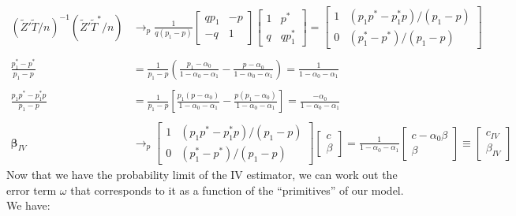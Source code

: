 \documentclass[12pt]{article}
\begin{document}
\begin{align*}
\left( \widetilde{Z}'\widetilde{T}/n \right)^{-1}\left( \widetilde{Z}'\widetilde{T}^*/n \right) &\rightarrow_p \frac{1}{q(p_1 -p)}\left[
\begin{array}{cc}
  qp_1 & - p\\
  -q & 1 
\end{array}
\right]
\left[
\begin{array}{cc}
  1 & p^*\\
  q & qp_1^*
\end{array}
\right]= 
\left[
\begin{array}{cc}
  1 & (p_1 p^* - p_1^* p)/(p_1 - p)\\
  0 & (p_1^* - p^*) / (p_1 - p)
\end{array}
\right] \\ \\ 
\frac{p_1^* - p^*}{p_1 - p} &= \frac{1}{p_1 - p}\left( \frac{p_1 - \alpha_0}{1 - \alpha_0 - \alpha_1} - \frac{p - \alpha_0}{1 - \alpha_0 - \alpha_1} \right) = \frac{1}{1 - \alpha_0 - \alpha_1}\\ \\
\frac{p_1 p^* - p_1^*p}{p_1 - p} &= \frac{1}{p_1 - p}\left[ \frac{p_1(p - \alpha_0)}{1 - \alpha_0 - \alpha_1} -  \frac{p(p_1 - \alpha_0)}{1 - \alpha_0 - \alpha_1} \right] = \frac{-\alpha_0}{1 - \alpha_0 - \alpha_1}\\ \\
\boldsymbol{\beta}_{IV} &\rightarrow_p 
\left[
\begin{array}{cc}
  1 & (p_1 p^* - p_1^* p)/(p_1 - p)\\
  0 & (p_1^* - p^*) / (p_1 - p)
\end{array}
\right]\left[
\begin{array}{c}
  c \\ \beta
\end{array}
\right] = \frac{1}{1 - \alpha_0 - \alpha_1}\left[
\begin{array}{c} 
  c - \alpha_0 \beta \\
  \beta
\end{array}
\right] \equiv
\left[
\begin{array}{c}
  c_{IV}\\ \beta_{IV}
\end{array}
\right]
\end{align*}
Now that we have the probability limit of the IV estimator, we can work out the error term $\omega$ that corresponds to it as a function of the ``primitives'' of our model.
We have:
\end{document}
